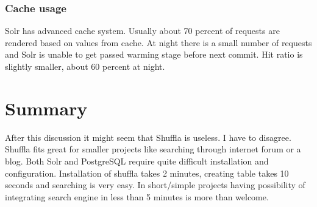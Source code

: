 \documentclass[10pt,a4paper]{article}
\begin{document}
\subsubsection*{Cache usage}
Solr has advanced cache system. Usually about 70 percent of requests are rendered based on values from cache.  At night there is a small number of requests and Solr is unable to get passed warming stage before next commit.  Hit ratio is slightly smaller, about 60 percent at night.

\section{Summary}

After this discussion it might seem that Shuffla is useless. I have to disagree. Shuffla fits great for smaller projects like searching through internet forum or a blog. Both Solr and PostgreSQL require quite difficult installation and configuration. Installation of shuffla takes 2 minutes, creating table takes 10 seconds and searching is very easy. In short/simple projects having possibility of integrating search engine in less than 5 minutes is more than welcome.


\newpage



\end{document}
